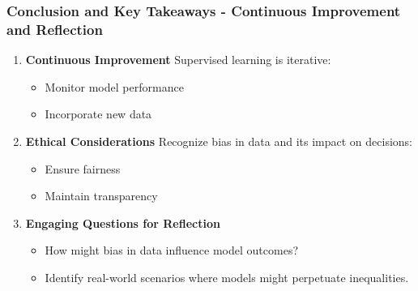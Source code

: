 \documentclass[aspectratio=169]{beamer}
\begin{document}
\begin{frame}[fragile]
    \frametitle{Conclusion and Key Takeaways - Continuous Improvement and Reflection}
    
    \begin{enumerate}
        \item \textbf{Continuous Improvement}  
            Supervised learning is iterative:
            \begin{itemize}
                \item Monitor model performance
                \item Incorporate new data
            \end{itemize}

        \item \textbf{Ethical Considerations}  
            Recognize bias in data and its impact on decisions:
            \begin{itemize}
                \item Ensure fairness
                \item Maintain transparency
            \end{itemize}

        \item \textbf{Engaging Questions for Reflection}
            \begin{itemize}
                \item How might bias in data influence model outcomes?
                \item Identify real-world scenarios where models might perpetuate inequalities.
            \end{itemize}
    \end{enumerate}
\end{frame}
\end{document}
